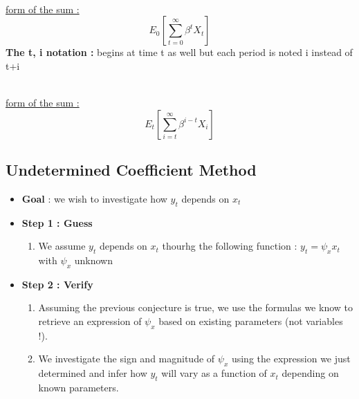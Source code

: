 \documentclass{article}
\begin{document}
{{\begin{tikzpicture}[>=stealth, thick]
 \end{tikzpicture} \\ 
\underline{form of the sum :}
\begin{equation}
    E_0[\sum_{t=0}^\infty\beta^{t}X_t]
\end{equation}
\textbf{The t, i notation :} begins at time t as well but each period is noted i instead of t+i\\
   \\
\underline{form of the sum :}
\begin{equation}
    E_t[\sum_{i=t}^\infty\beta^{i-t}X_i]
\end{equation}

\subsection{Undetermined Coefficient Method}
\begin{UCMbox}
\begin{itemize}
    \item \textbf{Goal} : we wish to investigate how $y_t$ depends on $x_t$
    \item \textbf{Step 1 : Guess}
    \begin{enumerate}
        \item We assume $y_t$ depends on $x_t$ thourhg the following function : $y_t = \psi_xx_t$ with $\psi_x$ unknown
    \end{enumerate}
    \item \textbf{Step 2 : Verify}
    \begin{enumerate}
        \item Assuming the previous conjecture is true, we use the formulas we know to retrieve an expression of $\psi_x$ based on existing parameters (not variables !). 
        \item We investigate the sign and magnitude of $\psi_x$ using the expression we just determined and infer how $y_t$ will vary as a function of $x_t$ depending on known parameters. 
    \end{enumerate}
\end{itemize}
\end{UCMbox}

}}
\end{document}
